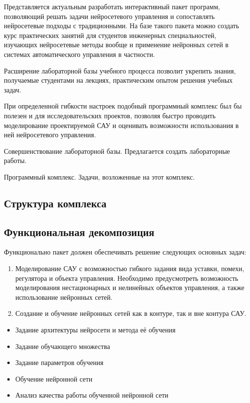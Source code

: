 Представляется актуальным разработать интерактивный пакет программ,
позволяющий решать задачи нейросетевого управления и сопоставлять
нейросетевые подходы с традиционными.  На базе такого пакета можно
создать курс практических занятий для студентов инженерных
специальностей, изучающих нейросетевые методы вообще и применение
нейронных сетей в системах автоматического управления в частности.

Расширение лабораторной базы учебного процесса позволит укрепить
знания, получаемые студентами на лекциях, практическим опытом решения
учебных задач.  

При определенной гибкости настроек подобный программный комплекс был
бы полезен и для исследовательских проектов, позволяя быстро проводить
моделирование проектируемой САУ и оценивать возможности использования
в ней нейросетевого управления.





Совершенствование лабораторной базы.  Предлагается создать лабораторные работы.

Программный комплекс.
Задачи, возложенные на этот комплекс.

\subsection{Структура комплекса}

\subsection{Функциональная декомпозиция}

Функционально пакет должен обеспечивать решение следующих основных
задач:
\begin{enumerate}
\item Моделирование САУ с возможностью гибкого задания вида уставки,
  помехи, регулятора и объекта управления.  Необходимо предусмотреть
  возможность моделирования нестационарных и нелинейных объектов
  управления, а также использование нейронных сетей.
\item Создание и обучение нейронных сетей как в контуре, так и вне
  контура САУ.
\end{enumerate}

\begin{itemize}
\item Задание архитектуры нейросети и метода её обучения
\item Задание обучающего множества
\item Задание параметров обучения
\item Обучение нейронной сети
\item Анализ качества работы обученной нейронной сети
\end{itemize}

